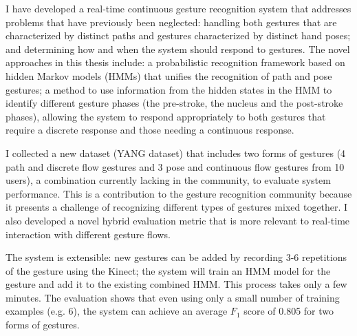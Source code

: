 I have developed a real-time continuous gesture recognition system that
addresses problems that have previously been neglected: handling both gestures that are
characterized by distinct paths and gestures characterized by distinct hand
poses; and determining how and when the system should respond to gestures.
The novel approaches in this thesis include: a probabilistic recognition
framework based on hidden Markov models (HMMs) that unifies the recognition of
path and pose gestures;
a method to use information from the
hidden states in the HMM to identify different
gesture phases (the pre-stroke, the nucleus and the post-stroke
phases), allowing the system to respond appropriately to both gestures that
require a discrete response and those needing a continuous response.

I collected a new dataset (YANG dataset) that includes two forms of
gestures (4 path and discrete flow gestures and 3 pose and continuous flow
gestures from 10 users), a combination currently lacking in the community, to
evaluate system performance. This is a contribution to the gesture recognition
community because it presents a challenge of recognizing different
types of gestures mixed together. I also developed a novel hybrid evaluation
metric that is more relevant to real-time interaction with different gesture flows.

The system is extensible: new gestures can be added by recording 3-6 repetitions
of the gesture using the Kinect; the system will train an HMM model for the gesture
and add it to the existing combined HMM. This process takes only a few minutes.
The evaluation shows that even using only a small number of
training examples (e.g. 6), the system can achieve an average $F_1$ score of 0.805 for
two forms of gestures.
